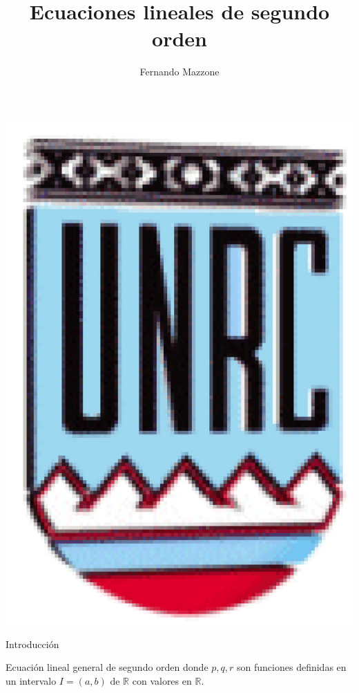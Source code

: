 \documentclass[handout,hyperref={colorlinks=true}]{beamer}
\title[Ecuaciones lineales de segundo orden] %
{%
 Ecuaciones lineales de segundo orden
}
\author[] %
{Fernando Mazzone}
\institute[Depto de Matemática] %
{
 Depto de Matemática\\
Facultad de Ciencias Exactas Físico-Químicas y Naturales\\
Universidad Nacional de Río Cuarto}
\newcommand{\rr}{\mathbb{R}}
\begin{document}
\begin{frame}
  \maketitle
  \begin{center}
   \includegraphics[scale=0.2]{imagenes/unrc.jpg}
   \end{center}
\end{frame}










\begin{frame}{Introducción}
\begin{block}{Ecuación lineal general de segundo orden}
donde $p,q,r$ son funciones definidas en un intervalo $I=(a,b)$ de $\rr$ con valores en $\rr$. 
\end{block}

\end{frame}
\end{document}
